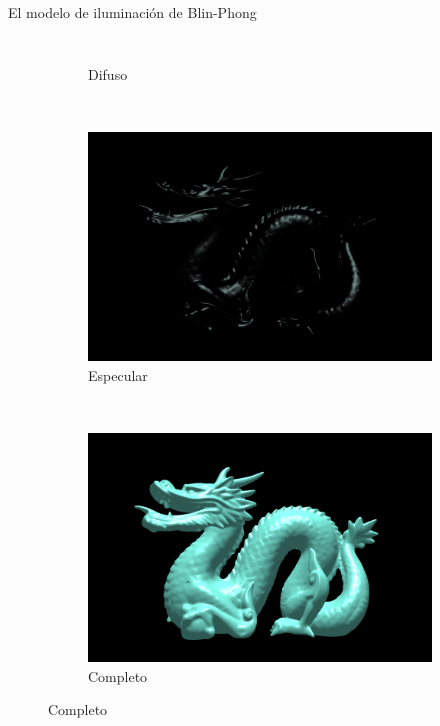 \begin{frame}{El modelo de iluminación de Blin-Phong}
\begin{columns}
\begin{figure}[htp]
\begin{subfigure}[b]{0.42\textwidth}
   \caption{Difuso}
 \end{subfigure}
\\
 \begin{subfigure}[b]{0.42\textwidth}
   \includegraphics[width=\textwidth]{img/especular}
   \caption{Especular}
 \end{subfigure}
~
 \begin{subfigure}[b]{0.42\textwidth}
   \includegraphics[width=\textwidth]{img/completo}
   \caption{Completo}
 \end{subfigure}
\end{figure} 
\end{columns}
\end{frame}

